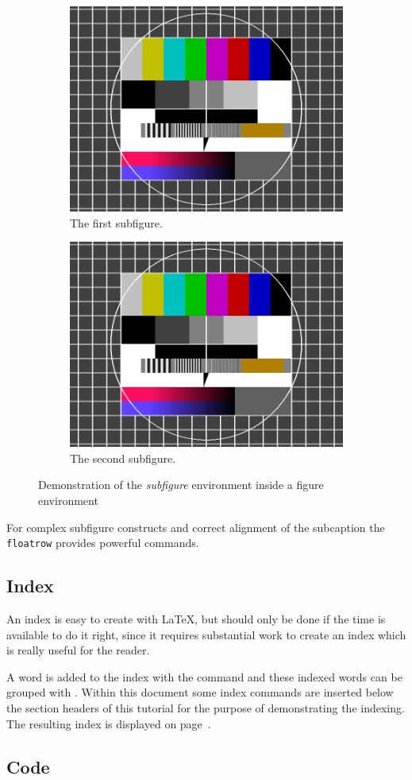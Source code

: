 \begin{figure}[htb]
  \begin{subfigure}[b]{.45\linewidth}
    \centering
    \includegraphics[width=0.5\linewidth]{images/testimage.png}
    \caption{The first subfigure.}
    \label{fig:example:subfigures:a}
  \end{subfigure}%
  \begin{subfigure}[b]{.45\linewidth}
    \centering
    \includegraphics[width=0.5\linewidth]{images/testimage.png}
    \caption{The second subfigure.}
    \label{fig:example:subfigures:b}
  \end{subfigure}
  \caption{Demonstration of the \emph{subfigure} environment inside a figure environment}
  \label{fig:example:subfigures}
\end{figure}
%
For complex subfigure constructs and correct alignment of the subcaption the \texttt{floatrow} provides powerful commands. 

\subsection{Index}
\label{sec:example:index}
%
An index is easy to create with LaTeX, but should only be done if the time is available to do it right, since it requires substantial work to create an index which is really useful for the reader.

A word is added to the index with the command  and these indexed words can be grouped with . Within this document some index commands are inserted below the section headers of this tutorial for the purpose of demonstrating the indexing. The resulting index is displayed on page~\pageref{sec:Index}. 
\clearpage
\subsection{Code}
\label{sec:example:code}


